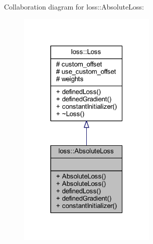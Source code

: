 Collaboration diagram for loss\+:\+:Absolute\+Loss\+:
\nopagebreak
\begin{figure}[H]
\begin{center}
\leavevmode
\includegraphics[width=187pt]{classloss_1_1_absolute_loss__coll__graph}
\end{center}
\end{figure}
